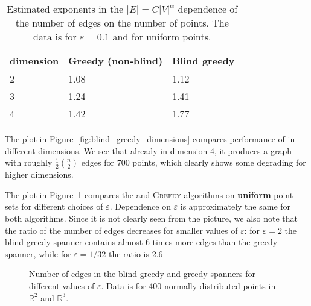 \documentclass{ws-ijcga}
\newcommand{\eps}{\varepsilon}
\newcommand{\RR}{\mathbb{R}}
\def \expDistDataPath {./}
\begin{document}
\begin{table}[b]
\begin{tabular}{|l|l|l|}
\hline
dimension & \textbf{Greedy (non-blind)} & \textbf{Blind greedy} \\ \hline
2         &         1.08                &  1.12                 \\ \hline
3         &         1.24                &  1.41                \\ \hline
4         &         1.42                &  1.77                 \\ \hline
\end{tabular}
\caption{Estimated exponents in the $|E|= C |V|^\alpha$ dependence of the number of edges
on the number of points. The data is for $\eps = 0.1$ and for uniform points.}
\label{tbl:regr_coeff_spanner}
\end{table}


The plot in Figure~\ref{fig:blind_greedy_dimensions}
compares performance of \bgrdy in different dimensions.
We see that already in dimension 4, it produces a graph with roughly $\frac{1}{2}\binom{n}{2}$
edges for $700$ points, which clearly shows some degrading for higher dimensions.


The plot in Figure~\ref{fig:spanner_eps_dependence}
compares the \bgrdy and \textsc{Greedy} algorithms
on \textbf{uniform} point sets for different choices of $\eps$. Dependence on $\eps$
is approximately the same for both algorithms. Since it is not clearly seen from the picture, we also note
that the ratio of the number of edges decreases for
smaller values of $\eps$: 
for $\eps = 2$ the blind greedy spanner contains almost 6 times more edges than the greedy spanner,
while for $\eps = 1/32$ the ratio is 2.6


\begin{figure}[ht]
        \caption{Number of edges in the blind greedy and greedy spanners for different values of $\eps$. Data is for 400 normally distributed points in $\RR^2$ and $\RR^3$.}
        \label{fig:spanner_eps_dependence}
\end{figure}
\end{document}
